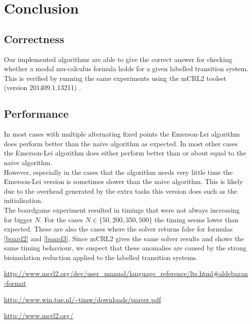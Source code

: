 \documentclass[10pt,a4paper]{article}
\begin{document}
\section{Conclusion}\label{conc}

\subsection{Correctness}
Our implemented algorithms are able to give the correct answer for checking whether a modal mu-calculus formula holds for a given labelled transition system. This is verified by running the same experiments using the mCRL2 toolset (version 201409.1.13211) \cite{mcrl2}.


\subsection{Performance}
In most cases with multiple alternating fixed points the Emerson-Lei algorithm does perform better than the naive algorithm as expected. In most other cases the Emerson-Lei algorithm does either perform better than or about equal to the naive algorithm.\\ However, especially in the cases that the algorithm needs very little time the Emerson-Lei version is sometimes slower than the naive algorithm. This is likely due to the overhead generated by the extra tasks this version does such as the initialisation.\\
The boardgame experiment resulted in timings that were not always increasing for bigger $N$. For the cases $N \in \{50, 200, 350, 500\}$ the timing seems lower than expected. These are also the cases where the solver returns false for formulas \ref{board2} and \ref{board3}. Since mCRL2 gives the same solver results and shows the same timing behaviour, we suspect that these anomalies are caused by the strong bisimulation reduction applied to the labelled transition systems.




\begin{thebibliography}{9}
	 \url{http://www.mcrl2.org/dev/user_manual/language_reference/lts.html#aldebaran-format}
	
	 \url{http://www.win.tue.nl/\~timw/downloads/parser.pdf}

	 \url{http://www.mcrl2.org/}
	
\end{thebibliography}
\end{document}
